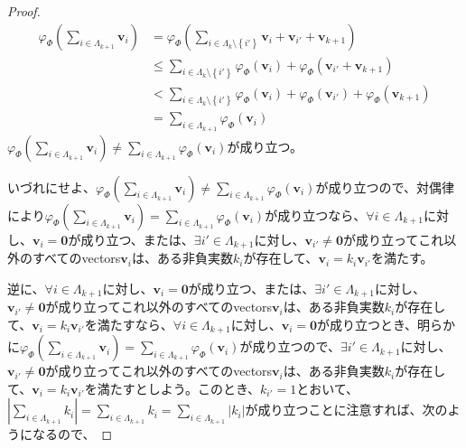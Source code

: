 \documentclass[dvipdfmx]{jsarticle}
\begin{document}
\begin{proof}
\begin{align*}
\varphi_{\varPhi}\left( \sum_{i \in \varLambda_{k + 1}} \mathbf{v}_{i} \right) &= \varphi_{\varPhi}\left( \sum_{i \in \varLambda_{k} \setminus \left\{ i' \right\}} \mathbf{v}_{i} + \mathbf{v}_{i'} + \mathbf{v}_{k + 1} \right)\\
&\leq \sum_{i \in \varLambda_{k} \setminus \left\{ i' \right\}} {\varphi_{\varPhi}\left( \mathbf{v}_{i} \right)} + \varphi_{\varPhi}\left( \mathbf{v}_{i'} + \mathbf{v}_{k + 1} \right)\\
&< \sum_{i \in \varLambda_{k} \setminus \left\{ i' \right\}} {\varphi_{\varPhi}\left( \mathbf{v}_{i} \right)} + \varphi_{\varPhi}\left( \mathbf{v}_{i'} \right) + \varphi_{\varPhi}\left( \mathbf{v}_{k + 1} \right)\\
&= \sum_{i \in \varLambda_{k + 1}} {\varphi_{\varPhi}\left( \mathbf{v}_{i} \right)}
\end{align*}
$\varphi_{\varPhi}\left( \sum_{i \in \varLambda_{k + 1}} \mathbf{v}_{i} \right) \neq \sum_{i \in \varLambda_{k + 1}} {\varphi_{\varPhi}\left( \mathbf{v}_{i} \right)}$が成り立つ。\par
いづれにせよ、$\varphi_{\varPhi}\left( \sum_{i \in \varLambda_{k + 1}} \mathbf{v}_{i} \right) \neq \sum_{i \in \varLambda_{k + 1}} {\varphi_{\varPhi}\left( \mathbf{v}_{i} \right)}$が成り立つので、対偶律により$\varphi_{\varPhi}\left( \sum_{i \in \varLambda_{k + 1}} \mathbf{v}_{i} \right) = \sum_{i \in \varLambda_{k + 1}} {\varphi_{\varPhi}\left( \mathbf{v}_{i} \right)}$が成り立つなら、$\forall i \in \varLambda_{k + 1}$に対し、$\mathbf{v}_{i} = \mathbf{0}$が成り立つ、または、$\exists i' \in \varLambda_{k + 1}$に対し、$\mathbf{v}_{i'} \neq \mathbf{0}$が成り立ってこれ以外のすべてのvectors$\mathbf{v}_{i}$は、ある非負実数$k_{i}$が存在して、$\mathbf{v}_{i} = k_{i}\mathbf{v}_{i'}$を満たす。\par
逆に、$\forall i \in \varLambda_{k + 1}$に対し、$\mathbf{v}_{i} = \mathbf{0}$が成り立つ、または、$\exists i' \in \varLambda_{k + 1}$に対し、$\mathbf{v}_{i'} \neq \mathbf{0}$が成り立ってこれ以外のすべてのvectors$\mathbf{v}_{i}$は、ある非負実数$k_{i}$が存在して、$\mathbf{v}_{i} = k_{i}\mathbf{v}_{i'}$を満たすなら、$\forall i \in \varLambda_{k + 1}$に対し、$\mathbf{v}_{i} = \mathbf{0}$が成り立つとき、明らかに$\varphi_{\varPhi}\left( \sum_{i \in \varLambda_{k + 1}} \mathbf{v}_{i} \right) = \sum_{i \in \varLambda_{k + 1}} {\varphi_{\varPhi}\left( \mathbf{v}_{i} \right)}$が成り立つので、$\exists i' \in \varLambda_{k + 1}$に対し、$\mathbf{v}_{i'} \neq \mathbf{0}$が成り立ってこれ以外のすべてのvectors$\mathbf{v}_{i}$は、ある非負実数$k_{i}$が存在して、$\mathbf{v}_{i} = k_{i}\mathbf{v}_{i'}$を満たすとしよう。このとき、$k_{i'} = 1$とおいて、$\left| \sum_{i \in \varLambda_{k + 1}} k_{i} \right| = \sum_{i \in \varLambda_{k + 1}} k_{i} = \sum_{i \in \varLambda_{k + 1}} \left| k_{i} \right|$が成り立つことに注意すれば、次のようになるので、

\end{proof}
\end{document}
